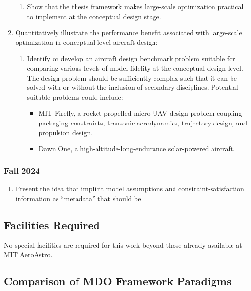 \documentclass[12pt,vi,oneside]{report}
\begin{document}
\begin{enumerate}
\begin{enumerate}
            \item Show that the thesis framework makes large-scale optimization practical to implement at the conceptual design stage.
        \end{enumerate}
        \item Quantitatively illustrate the performance benefit associated with large-scale optimization in conceptual-level aircraft design:
        \begin{enumerate}
            \item Identify or develop an aircraft design benchmark problem suitable for comparing various levels of model fidelity at the conceptual design level. The design problem should be sufficiently complex such that it can be solved with or without the inclusion of secondary disciplines. Potential suitable problems could include:
            \begin{itemize}[nolistsep]
                \item MIT Firefly, a rocket-propelled micro-UAV design problem coupling packaging constraints, transonic aerodynamics, trajectory design, and propulsion design.
                \item Dawn One, a high-altitude-long-endurance solar-powered aircraft.
            \end{itemize}
        \end{enumerate}
    \end{enumerate}

    \subsection*{Fall 2024}

    \begin{enumerate}
        \item Present the idea that implicit model assumptions and constraint-satisfaction information as ``metadata'' that should be
    \end{enumerate}


    \section{Facilities Required}
    \label{sec:facilities}

    No special facilities are required for this work beyond those already available at MIT AeroAstro.

    

    \begin{appendices}
        \chapter{Comparison of MDO Framework Paradigms}
        \label{sec:paradigm_comparison}

    \end{appendices}
\end{document}
